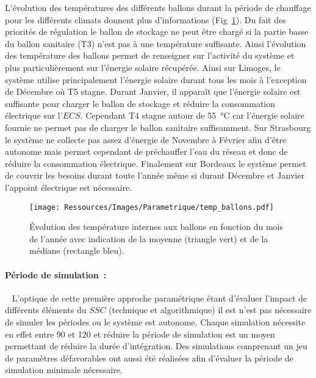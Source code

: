 L’évolution des températures des différents ballons durant la période de chauffage pour
les différents climats donnent plus d’informations (Fig~\ref{fig:temp_ballon_mensuel}). Du fait des priorités de régulation
le ballon de stockage ne peut être chargé si la partie basse du ballon sanitaire (T3)
n’est pas à une température suffisante. Ainsi l’évolution des température des ballons
permet de renseigner sur l’activité du système et plus particulièrement sur l’énergie solaire
récupérée. Ainsi sur Limoges, le système utilise principalement l’énergie solaire durant tous
les mois à l’exception de Décembre où T5 stagne. Durant Janvier, il apparaît que
l’énergie solaire est suffisante pour charger le ballon de stockage et réduire la
consommation électrique sur l’$ECS$. Cependant T4 stagne autour de \SI{55}{\celsius}
car l’énergie solaire fournie ne permet pas de charger le ballon sanitaire suffisamment.
Sur Strasbourg le système ne collecte pas assez d’énergie de Novembre à Février afin
d’être autonome mais permet cependant de préchauffer l’eau du réseau et donc de réduire
la consommation électrique. Finalement sur Bordeaux le système permet de couvrir les
besoins durant toute l’année même si durant Décembre et Janvier l’appoint électrique
est nécessaire.

\begin{figure}
    \begin{center}
        \texttt{[image: Ressources/Images/Parametrique/temp\_ballons.pdf]}
    \end{center}
    \caption{Évolution des température internes aux ballons en fonction du mois
             de l’année avec indication de la moyenne (triangle vert) et
             de la médiane (rectangle bleu).
             \label{fig:temp_ballon_mensuel}}
\end{figure}


\paragraph{Période de simulation~:} %
\label{par:période_de_simulation}
~
L’optique de cette première approche paramétrique étant d’évaluer l’impact de différents
éléments du $SSC$ (technique et algorithmique) il est n’est pas nécessaire de simuler les
périodes ou le système est autonome. Chaque simulation nécessite en effet entre
\SI{90}{\min} et \SI{120}{\min} et réduire la période de simulation est un moyen
permettant de réduire la durée d’intégration. Des simulations comprenant un jeu de
paramètres défavorables ont aussi été réalisées afin d’évaluer la période de simulation
minimale nécessaire.

